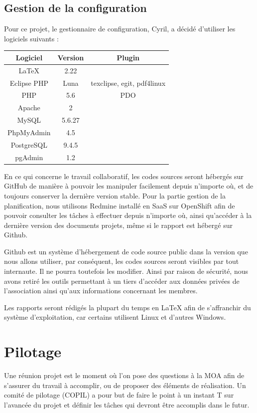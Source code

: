 \documentclass[11pt]{report}
\begin{document}
\subsection{Gestion de la configuration}
Pour ce projet, le gestionnaire de configuration, Cyril, a décidé d'utiliser
les logiciels suivants : \\ 
\par 
\begin{tabular}{ | c | c | c | }
\hline 
Logiciel & Version & Plugin  \\ \hline 
LaTeX & 2.22 &  \\ \hline
Eclipse PHP & Luna & texclipse, egit, pdf4linux \\ \hline
PHP & 5.6 & PDO \\ \hline
Apache & 2 & \\ \hline
MySQL & 5.6.27 & \\ \hline
PhpMyAdmin & 4.5 & \\ \hline
PostgreSQL & 9.4.5 & \\ \hline
pgAdmin & 1.2 & \\ \hline
\end{tabular}

\par En ce qui concerne le travail collaboratif, les codes sources seront
hébergés sur GitHub de manière à pouvoir les manipuler facilement depuis
n'importe où, et de toujours conserver la dernière version stable. Pour la
partie gestion de la planification, nous utilisons Redmine installé en SaaS
sur OpenShift afin de pouvoir consulter les tâches à effectuer depuis n'importe
où, ainsi qu'accéder à la dernière version des documents projets, même si le
rapport est hébergé sur Github.
\par Github est un système d'hébergement de code source public dans la version 
que nous allons utiliser, par conséquent, les codes sources seront visibles 
par tout internaute. Il ne pourra toutefois les modifier. Ainsi par raison de
sécurité, nous avons retiré les outils permettant à un tiers d'accéder aux
données privées de l'association ainsi qu'aux informations concernant les
membres.
\par Les rapports seront rédigés la plupart du temps en LaTeX afin de
s'affranchir du système d'exploitation, car certains utilisent Linux et
d'autres Windows. 

\section{Pilotage}
Une réunion projet est le moment où l'on pose des questions à la MOA afin de
s'assurer du travail à accomplir, ou de proposer des éléments de réalisation.
Un comité de pilotage (COPIL) a pour but de faire le point à un instant T sur
l'avancée du projet et définir les tâches qui devront être accomplis dans le 
futur. \\
\end{document}
